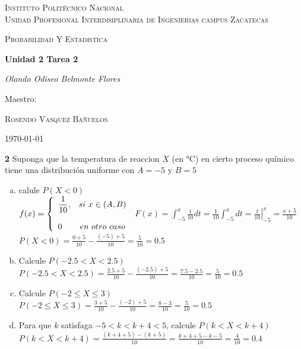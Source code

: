 \documentclass[12pt, letterpaper]{article}
\begin{document}
\begin{titlepage}
	\centering
	{\scshape\LARGE Instituto Politécnico Nacional\\ Unidad Profesional Interdisiplinaria de Ingenierias campus Zacatecas\par}
	\vspace{1cm}
	{\scshape\Large Probabilidad Y Estadistica\par}
	\vspace{1.5cm}
	{\huge\bfseries Unidad 2 Tarea 2\par}
	\vspace{2cm}
	{\Large\itshape Olando Odiseo Belmonte Flores\par}
	\vfill
	Maestro:\par
	\textsc{
	Rosendo Vasquez Bañuelos}
	\vfill
	{\large \today \par}
\end{titlepage}

\textbf{2} Suponga que la temperatura de reaccion $X$ (en °C) en cierto proceso químico tiene una distribución uniforme con $A=-5$ y $B=5$
\begin{enumerate}[a)]
    \item calule $P(X<0)$\\
		$f(x)=\left\{\begin{array}{l c}
			\displaystyle\frac{1}{10},& si\ x\in (A,B)\\ \\
			0 & en\ otro\ caso
		\end{array}\right.
		$\vskip0.1cm
		$F(x)=\displaystyle\int_{-5}^{x}\displaystyle\frac{1}{10}dt=\displaystyle\frac{1}{10}\int_{-5}^{x}dt = \left.\frac{t}{10} \right|_{-5}^x=\displaystyle\frac{x+5}{10}$\vskip0.1cm
		$P(X<0)=\displaystyle\frac{0+5}{10}-\displaystyle\frac{(-5)+5}{10}=\displaystyle\frac{5}{10}=0.5$

	\item Calcule $P(-2.5<X<2.5)$\vskip0.1cm
		$P(-2.5<X<2.5)=\displaystyle\frac{2.5+5}{10}-\displaystyle\frac{(-2.5)+5}{10}=\displaystyle\frac{7.5-2.5}{10}=\displaystyle\frac{5}{10}=0.5$

	\item Calcule $P(-2\leq X\leq 3)$\vskip0.1cm
		$P(-2\leq X\leq 3)=\displaystyle\frac{3+5}{10}-\displaystyle\frac{(-2)+5}{10}=\displaystyle\frac{8-3}{10}=\displaystyle\frac{5}{10}=0.5$

	\item Para que $k$ satisfaga $-5<k<k+4<5$, calcule $P(k<X<k+4)$\vskip0.1cm
	$P(k<X<k+4)=\displaystyle\frac{(k+4+5)-(k+5)}{10}=\displaystyle\frac{k+4+5-k-5}{10}=\displaystyle\frac{4}{10}=0.4$
\end{enumerate} \vskip1cm
\end{document}
